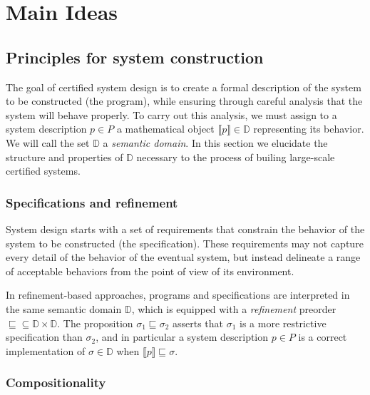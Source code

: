 \documentclass[acmsmall,timestamp,review,anonymous]{acmart}
\begin{document}


\section{Main Ideas} \label{sec:mainideas} %

\subsection{Principles for system construction} %


The goal of certified system design is
to create a formal description of
the system to be constructed (the program),
while ensuring through careful analysis that the system
will behave properly.
To carry out this analysis,
we must assign
to a system description $p \in P$
a mathematical object $\llbracket p \rrbracket \in \mathbb{D}$
representing its behavior.
We will call the set $\mathbb{D}$ a \emph{semantic domain}.
In this section we elucidate
the structure and properties of $\mathbb{D}$
necessary to the process of builing
large-scale certified systems.


\subsubsection{Specifications and refinement} %

System design starts with a set of requirements
that constrain the behavior of the system to be constructed
(the specification).
These requirements may not capture every detail
of the behavior of the eventual system,
but instead delineate a range of acceptable behaviors
from the point of view of its environment.

In refinement-based approaches,
programs and specifications are interpreted in the same
semantic domain $\mathbb{D}$,
which is equipped with a \emph{refinement} preorder
${\sqsubseteq} \subseteq \mathbb{D} \times \mathbb{D}$.
The proposition $\sigma_1 \sqsubseteq \sigma_2$
asserts that $\sigma_1$ is a more restrictive specification than $\sigma_2$,
and in particular a system description $p \in P$ is a correct implementation
of $\sigma \in \mathbb{D}$ when
$\llbracket p \rrbracket \sqsubseteq \sigma$.


\subsubsection{Compositionality} %
\end{document}
